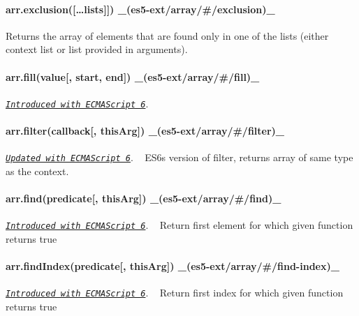 \paragraph*{arr.\+exclusion(\mbox{[}…lists\mbox{]}\mbox{]}) \+\_\+(es5-\/ext/array/\#/exclusion)\+\_\+}

Returns the array of elements that are found only in one of the lists (either context list or list provided in arguments).

\paragraph*{arr.\+fill(value\mbox{[}, start, end\mbox{]}) \+\_\+(es5-\/ext/array/\#/fill)\+\_\+}

\href{http://people.mozilla.org/~jorendorff/es6-draft.html#sec-array.fill}{\tt {\itshape Introduced with E\+C\+M\+A\+Script 6}}. ~\newline
 \paragraph*{arr.\+filter(callback\mbox{[}, this\+Arg\mbox{]}) \+\_\+(es5-\/ext/array/\#/filter)\+\_\+}

\href{http://people.mozilla.org/~jorendorff/es6-draft.html#sec-array.filter}{\tt {\itshape Updated with E\+C\+M\+A\+Script 6}}. ~\newline
E\+S6\textquotesingle{}s version of {\ttfamily filter}, returns array of same type as the context.

\paragraph*{arr.\+find(predicate\mbox{[}, this\+Arg\mbox{]}) \+\_\+(es5-\/ext/array/\#/find)\+\_\+}

\href{http://people.mozilla.org/~jorendorff/es6-draft.html#sec-array.find}{\tt {\itshape Introduced with E\+C\+M\+A\+Script 6}}. ~\newline
Return first element for which given function returns true

\paragraph*{arr.\+find\+Index(predicate\mbox{[}, this\+Arg\mbox{]}) \+\_\+(es5-\/ext/array/\#/find-\/index)\+\_\+}

\href{http://people.mozilla.org/~jorendorff/es6-draft.html#sec-array.findindex}{\tt {\itshape Introduced with E\+C\+M\+A\+Script 6}}. ~\newline
Return first index for which given function returns true

